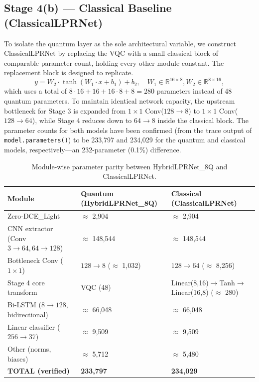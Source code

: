 \documentclass[preprint,12pt]{elsarticle}
\begin{document}
\subsection{Stage 4(b) — Classical Baseline (ClassicalLPRNet)}
To isolate the quantum layer as the sole architectural variable, we construct ClassicalLPRNet by replacing the VQC with a small classical block of comparable parameter count, holding every other module constant. The replacement block is designed to replicate.
\begin{equation}
y = W_2 \cdot \tanh(W_1 \cdot x + b_1) + b_2, \quad W_1 \in \mathbb{R}^{16\times 8}, W_2 \in \mathbb{R}^{8\times 16},
\end{equation}
which uses a total of $8 \cdot 16 + 16 + 16 \cdot 8 + 8 = 280$ parameters instead of 48 quantum parameters. To maintain identical network capacity, the upstream bottleneck for Stage 3 is expanded from $1 \times 1$ Conv($128 \rightarrow 8$) to $1 \times 1$ Conv($128 \rightarrow 64$), while Stage 4 reduces down to $64 \rightarrow 8$ inside the classical block. The parameter counts for both models have been confirmed (from the trace output of \texttt{model.parameters()}) to be 233,797 and 234,029 for the quantum and classical models, respectively---an 232-parameter (0.1\%) difference.

\begin{table}[h]
\centering
\caption{Module-wise parameter parity between HybridLPRNet\_8Q and ClassicalLPRNet.}
\label{tab:params}
\begin{tabularx}{\columnwidth}{@{}lXX@{}}
\toprule
\textbf{Module} & \textbf{Quantum (HybridLPRNet\_8Q)} & \textbf{Classical (ClassicalLPRNet)} \\
\midrule
Zero-DCE\_Light & $\approx$ 2,904 & $\approx$ 2,904 \\
CNN extractor (Conv $3\rightarrow 64, 64\rightarrow 128$) & $\approx$ 148,544 & $\approx$ 148,544 \\
Bottleneck Conv ($1\times 1$) & $128\rightarrow 8$ ($\approx$ 1,032) & $128\rightarrow 64$ ($\approx$ 8,256) \\
Stage 4 core transform & VQC (48) & Linear(8,16)$\rightarrow$Tanh$\rightarrow$Linear(16,8) ($\approx$ 280) \\
Bi-LSTM ($8 \rightarrow 128$, bidirectional) & $\approx$ 66,048 & $\approx$ 66,048 \\
Linear classifier ($256 \rightarrow 37$) & $\approx$ 9,509 & $\approx$ 9,509 \\
Other (norms, biases) & $\approx$ 5,712 & $\approx$ 5,480 \\
\textbf{TOTAL (verified)} & \textbf{233,797} & \textbf{234,029} \\
\bottomrule
\end{tabularx}
\end{table}
\end{document}
